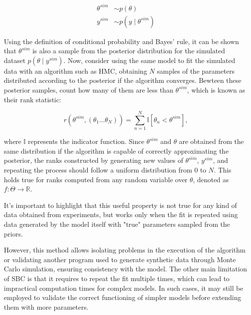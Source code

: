\begin{align}
\theta^{sim}&\sim p(\theta)\\
y^{sim}&\sim p(y\mid \theta^{sim})
\end{align}

Using the definition of conditional probability and Bayes' rule, it can be shown that $\theta^{sim}$ is also a sample from the posterior distribution for the simulated dataset $p(\theta\mid y^{sim})$. 
Now, consider using the same model to fit the simulated data with an algorithm such as HMC, obtaining $N$ samples of
the parameters distributed according to the posterior if the algorithm converges. Bewteen these posterior samples, count how many of them are less than $\theta^{sim}$, which is known as their rank statistic:

\begin{equation}
r(\theta^{sim}, (\theta_1\ldots\theta_N)) = \sum_{n=1}^N \mathbb I[\theta_n<\theta^{sim}],
\end{equation}

where $\mathbb I$ represents the indicator function. Since $\theta^{sim}$ and $\theta$ are obtained from the same
distribution if the algorithm is capable of correctly approximating the posterior, the ranks constructed by generating new values of $\theta^{sim}$, $y^{sim}$, and repeating the process should follow a uniform distribution from 0 to $N$. This holds true for ranks computed from any random variable over $\theta$, denoted as $f:\Theta\to \mathbb R$. 


It's important to highlight that this useful property is not true for any kind of data obtained from experiments, but
works only when the fit is repeated using data generated by the model itself with "true" parameters sampled from the priors.


However, this method allows isolating problems in the execution of the algorithm or validating another program used
to generate synthetic data through Monte Carlo simulation, ensuring consistency with the model. The other main
limitation of SBC is that it requires to repeat the fit multiple times, which can lead to impractical computation times
for complex models. In such cases, it may still be employed to validate the correct functioning of simpler models
before extending them with more parameters.

